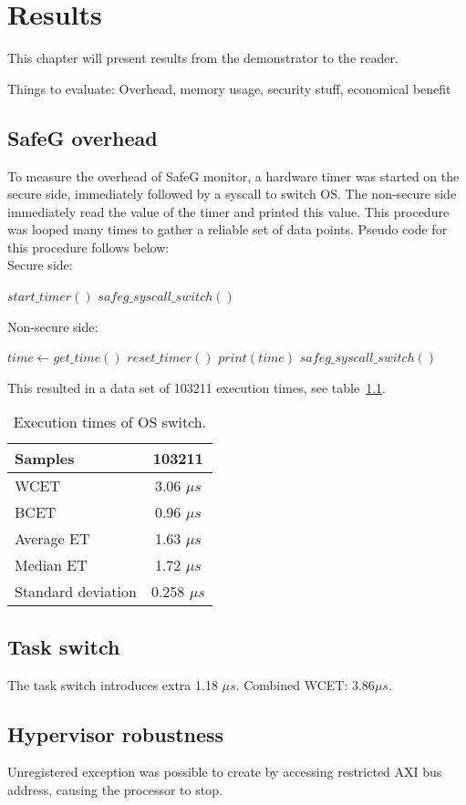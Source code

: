 \chapter{Results}
\label{sec:results}

This chapter will present results from the demonstrator to the reader.

Things to evaluate: Overhead, memory usage, security stuff, economical benefit


\section{SafeG overhead}
To measure the overhead of SafeG monitor, a hardware timer was started on the secure side, immediately followed by a syscall to switch OS. The non-secure side immediately read the value of the timer and printed this value. This procedure was looped many times to gather a reliable set of data points. Pseudo code for this procedure follows below:\\

Secure side:
\begin{algorithmic}
\Loop
	\State $start\_timer()$
	\State $safeg\_syscall\_switch()$
\EndLoop
\end{algorithmic}

Non-secure side:
\begin{algorithmic}
\Loop
	\State $time\gets get\_time()$
	\State $reset\_timer()$
	\State $print(time)$
	\State $safeg\_syscall\_switch()$
\EndLoop
\end{algorithmic}


This resulted in a data set of 103211 execution times, see table~\ref{table:switch_et}.

\begin{table}[H]
\centering
\begin{tabular}{|l|c|}
\hline
Samples & 103211\\ \hline
WCET & 3.06 $\mu s$\\ \hline
BCET & 0.96 $\mu s$\\ \hline
Average ET & 1.63 $\mu s$\\ \hline
Median ET & 1.72 $\mu s$\\ \hline
Standard deviation & 0.258 $\mu s$\\ \hline
\end{tabular}
\caption{Execution times of OS switch.}
\label{table:switch_et}
\end{table}

\section{Task switch}
The task switch introduces extra 1.18 $\mu s$. Combined WCET: $3.86 \mu s$.

\section{Hypervisor robustness}
Unregistered exception was possible to create by accessing restricted AXI bus address, causing the processor to stop.
